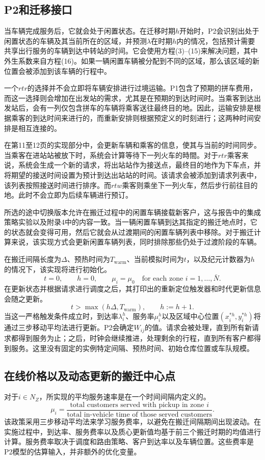 \documentclass{article}
\begin{document}
\subsection*{P2和迁移接口}
当车辆完成服务后，它就会处于闲置状态。在迁移时期$h$开始时，P2会识别出处于闲置状态的车辆及其当前所在的区域，并预测$\lambda$在时期$h$内的情况，包括预计需要共享出行服务的车辆到达中转站的时间。它会使用方程(3)--(15)来解决问题，其中外生系数来自方程(16)。如果一辆闲置车辆被分配到不同的区域，那么该区域的新位置会被添加到该车辆的行程中。

一个$rtr$的选择并不会立即将车辆安排进行过境运输。P1包含了预期的拼车费用，而这一选择则会增加在出发站的需求，尤其是在预期的到达时间时。当乘客到达出发站后，会有一列仅包含拼车的车辆将乘客送往最终目的地。因此，运输安排是根据乘客的到达时间来进行的，而重新安排则根据预定义的时刻进行；这两种时间安排是相互连接的。

在第11至12页的实现部分中，会更新车辆和乘客的信息，使其与当前的时间同步。当乘客在进站站被放下时，系统会计算等待下一列火车的時間。对于$rtr$乘客来说，系统会生成一个新的请求，将出站站作为接送点，最终目的地作为下车点，并将期望的接送时间设置为预计到达出站站的时间。该请求会被添加到请求列表中，该列表按照接送时间进行排序。而$rtw$乘客则乘坐下一列火车，然后步行前往目的地。此时不会立即为后续车辆进行预订。

所选的途中切换版本允许在搬迁过程中的闲置车辆接载新客户，这与报告中的集成策略实验以及附录4中的内容一致。当一辆闲置车辆到达其指定的搬迁地点时，它的状态就会变得可用，然后它就会从过渡期间的闲置车辆列表中移除。对于搬迁计算来说，该实现方式会更新闲置车辆列表，同时排除那些仍处于过渡阶段的车辆。

在搬迁间隔长度为$\Delta$、预热时间为$T_{\mathrm{warm}}$、当前模拟时间为$t$，以及纪元计数器为$h$的情况下，该实现将进行初始化。
\[
t=0,\qquad h=0,\qquad
\mu_i=\mu_0\quad\text{for each zone }i=1,\ldots,\bar N.
\]
在更新状态并根据请求进行调度之后，其打印出的重新定位触发器和时代更新信息会随之更新。
\[
t>\max(h\Delta,T_{\mathrm{warm}}),\qquad h:=h+1.
\]
当这一严格触发条件成立时，到达率$\lambda_i^h$、服务率$\mu_i^h$以及区域中心位置$(x_i^{*h},y_i^{*h})$将通过三步移动平均法进行更新。P2会确定$W_{ij}$的值。请求会被处理，直到所有新请求都得到服务为止；之后，时钟会继续推进，处理剩余的行程，直到所有客户都得到服务。这里没有固定的实例特定间隔、预热时间、初始仓库位置或车队规模。

\subsection*{在线价格以及动态更新的搬迁中心点}
对于$i\in N_Z$，所实现的平均服务速率是在一个时间间隔内定义的。
\[
\mu_i=
\frac{\text{total customers served with pickup in zone }i}
{\text{total in-vehicle time of those served customers}}.
\]
该政策采用三步移动平均法来学习服务费率，以避免在搬迁间隔期间出现波动。在实施过程中，到达率、服务费率以及质心更新值均基于前三个搬迁时期的均值进行计算。服务费率取决于调度和路由策略、客户到达率以及车辆位置。这些费率是P2模型的估算输入，并非额外的优化变量。
\end{document}
